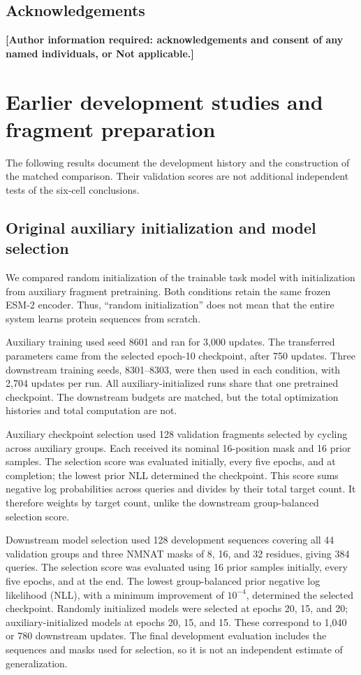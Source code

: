 \documentclass[referee,pdflatex,sn-vancouver-num]{sn-jnl}
\newcommand{\pending}[1]{\textbf{[Author information required: #1]}}
\begin{document}
\subsection*{Acknowledgements}
\pending{acknowledgements and consent of any named individuals, or Not applicable.}

\appendix
\setcounter{figure}{0}
\renewcommand{\thefigure}{S\arabic{figure}}
\section{Earlier development studies and fragment preparation}\label{app:development}
The following results document the development history and the construction of the matched comparison. Their validation scores are not additional independent tests of the six-cell conclusions.

\subsection{Original auxiliary initialization and model selection}
We compared random initialization of the trainable task model with initialization from auxiliary fragment pretraining. Both conditions retain the same frozen ESM-2 encoder. Thus, ``random initialization'' does not mean that the entire system learns protein sequences from scratch.

Auxiliary training used seed 8601 and ran for 3,000 updates. The transferred parameters came from the selected epoch-10 checkpoint, after 750 updates. Three downstream training seeds, 8301--8303, were then used in each condition, with 2,704 updates per run. All auxiliary-initialized runs share that one pretrained checkpoint. The downstream budgets are matched, but the total optimization histories and total computation are not.

Auxiliary checkpoint selection used 128 validation fragments selected by cycling across auxiliary groups. Each received its nominal 16-position mask and 16 prior samples. The selection score was evaluated initially, every five epochs, and at completion; the lowest prior NLL determined the checkpoint. This score sums negative log probabilities across queries and divides by their total target count. It therefore weights by target count, unlike the downstream group-balanced selection score.

Downstream model selection used 128 development sequences covering all 44 validation groups and three NMNAT masks of 8, 16, and 32 residues, giving 384 queries. The selection score was evaluated using 16 prior samples initially, every five epochs, and at the end. The lowest group-balanced prior negative log likelihood (NLL), with a minimum improvement of $10^{-4}$, determined the selected checkpoint. Randomly initialized models were selected at epochs 20, 15, and 20; auxiliary-initialized models at epochs 20, 15, and 15. These correspond to 1,040 or 780 downstream updates. The final development evaluation includes the sequences and masks used for selection, so it is not an independent estimate of generalization.
\end{document}
